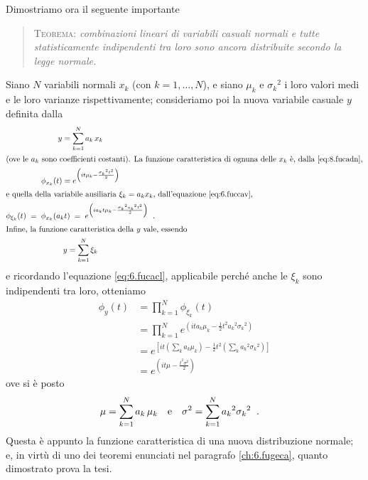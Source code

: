 Dimostriamo ora il seguente importante
\begin{quote}
  \textsc{Teorema:}%
  \label{th:8.colino}
  \textit{combinazioni lineari di variabili casuali normali
    e tutte statisticamente indipendenti tra loro sono
    ancora distribuite secondo la legge normale.}
\end{quote}
Siano $N$ variabili normali $x_k$ (con $k=1,\ldots,N$), e
siano $\mu_k$ e ${\sigma_k}^2$ i loro valori medi e le loro
varianze rispettivamente; consideriamo poi la nuova
variabile casuale $y$ definita dalla
\begin{gather*}
  y = \sum_{k=1}^N a_k \, x_k \\
  \intertext{(ove le $a_k$ sono coefficienti costanti). La
    funzione caratteristica di ognuna delle $x_k$ \`e, dalla
    \eqref{eq:8.fucadn},}
  \phi_{x_k}(t) = e^{\left( i t \mu_k -
    \frac{{\sigma_k}^2 t^2}{2} \right)} \\
  \intertext{e quella della variabile ausiliaria $\xi_k =
    a_k x_k$, dall'equazione \eqref{eq:6.fuccav},}
  \phi_{\xi_k}(t) \; = \; \phi_{x_k}(a_k t) \; =
    \;e^{\left( i a_k t \mu_k - \frac{{\sigma_k}^2
    {a_k}^2 t^2}{2} \right)} \;\; . \\
  \intertext{Infine, la funzione caratteristica della
    $y$ vale, essendo}
  y = \sum_{k=1}^N \xi_k
\end{gather*}
e ricordando l'equazione \eqref{eq:6.fucacl}, applicabile
perch\'e anche le $\xi_k$ sono indipendenti tra loro,
otteniamo
\begin{align*}
  \phi_y(t) &= \prod_{k=1}^N \phi_{\xi_k}(t) \\[1ex]
  &= \prod_{k=1}^N e^{\left( i t a_k \mu_k -
    \frac{1}{2} t^2 {a_k}^2 {\sigma_k}^2 \right)} \\[1ex]
  &= e^{\left[ i t \left( \sum_k a_k \mu_k \right) -
    \frac{1}{2} t^2 \left( \sum_k {a_k}^2 {\sigma_k}^2
    \right) \right]} \\[1ex]
  &= e^{\left( i t \mu - \frac{t^2 \sigma^2}{2}
    \right)}
\end{align*}
ove si \`e posto
\begin{align*}
  \mu &= \sum_{k=1}^N a_k \, \mu_k &&\text{e} &
    \sigma^2 &= \sum_{k=1}^N {a_k}^2 {\sigma_k}^2 \;\; .
\end{align*}
Questa \`e appunto la funzione caratteristica di una nuova
distribuzione normale; e, in virt\`u di uno dei teoremi
enunciati nel paragrafo \ref{ch:6.fugeca}, quanto dimostrato
prova la tesi.%
%

